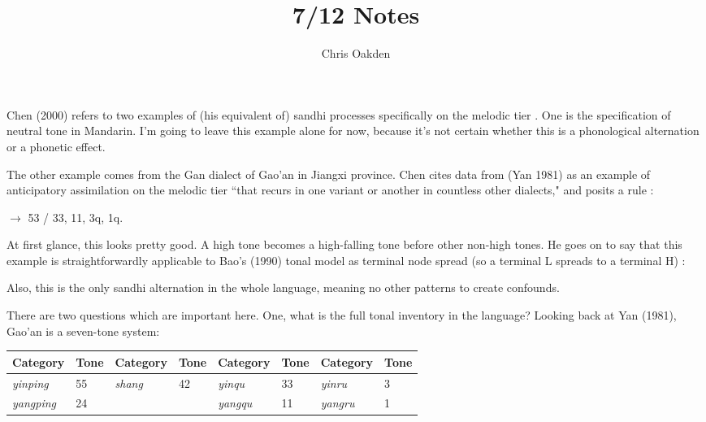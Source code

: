 \documentclass{article}
\title{7/12 Notes}
\author{Chris Oakden}
\begin{document}
\maketitle
Chen (2000) refers to two examples of (his equivalent of) sandhi processes specifically on the melodic tier \cite{Chen2000}.  One is the specification of neutral tone in Mandarin. I'm going to leave this example alone for now, because it's not certain whether this is a phonological alternation or a phonetic effect.\par
The other example comes from the Gan dialect of Gao'an in Jiangxi province. Chen cites data from (Yan 1981) as an example of anticipatory assimilation on the melodic tier ``that recurs in one variant or another in countless other dialects," and posits a rule \cite{Yan1981}:
\begin{exe}
 $\rightarrow$ 53 / \underline{\hspace{1em}} 33, 11, 3q, 1q.
\end{exe}
At first glance, this looks pretty good. A high tone becomes a high-falling tone before other non-high tones. He goes on to say that this example is straightforwardly applicable to Bao's (1990) tonal model as terminal node spread (so a terminal L spreads to a terminal H) \cite{Bao1990}:
\begin{exe}
\ex
{}
\end{exe}
Also, this is the only sandhi alternation in the whole language, meaning no other patterns to create confounds. \par
There are two questions which are important here. One, what is the full tonal inventory in the language? Looking back at Yan (1981), Gao'an is a seven-tone system:
\begin{exe}
\ex
\begin{tabular}[t]{ll|ll|ll|ll}
Category & Tone & Category & Tone & Category & Tone & Category & Tone \\
\hline
\textit{yinping} & 55 & \textit{shang} & 42 & \textit{yinqu} & 33 & \textit{yinru} & 3 \\
\textit{yangping} & 24 & & & \textit{yangqu} & 11 & \textit{yangru} & 1 \\
\end{tabular}
\end{exe}
\end{document}
